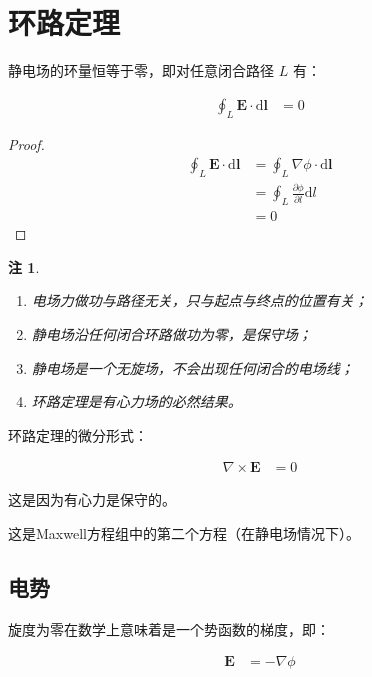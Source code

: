 \documentclass[12pt,onecolumn,a4paper]{book}
\newtheorem*{note}{注}
\numberwithin{table}{subsection}
\numberwithin{equation}{subsection}
\begin{document}
\section{环路定理}

静电场的环量恒等于零，即对任意闭合路径 $L$ 有：

\begin{align}
    \oint_{L} \mathbf{E} \cdot \mathrm{d} \mathbf{l} & = 0
\end{align}

\begin{proof}
    \begin{align}
        \oint_{L} \mathbf{E} \cdot \mathrm{d} \mathbf{l} & = \oint_{L} \nabla \phi \cdot \mathrm{d} \mathbf{l}       \\
                                                         & = \oint_{L} \frac{\partial \phi}{\partial l} \mathrm{d} l \\
                                                         & = 0
    \end{align}
\end{proof}

\begin{note}
    \begin{enumerate}
        \item 电场力做功与路径无关，只与起点与终点的位置有关；
        \item 静电场沿任何闭合环路做功为零，是保守场；
        \item 静电场是一个无旋场，不会出现任何闭合的电场线；
        \item 环路定理是有心力场的必然结果。
    \end{enumerate}
\end{note}

环路定理的微分形式：

\begin{align}
    \nabla \times \mathbf{E} & = 0
\end{align}

这是因为有心力是保守的。

这是Maxwell方程组中的第二个方程（在静电场情况下）。

\subsection{电势}

旋度为零在数学上意味着是一个势函数的梯度，即：

\begin{align}
    \mathbf{E} & = - \nabla \phi
\end{align}
\end{document}
